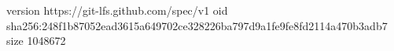 version https://git-lfs.github.com/spec/v1
oid sha256:248f1b87052ead3615a649702ce328226ba797d9a1fe9fe8fd2114a470b3adb7
size 1048672
